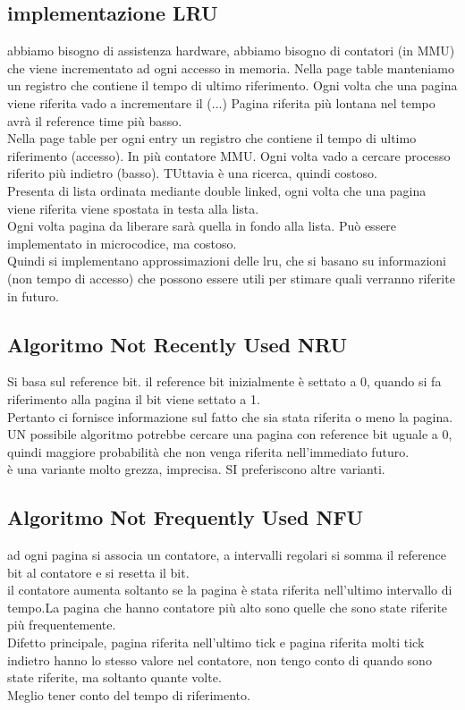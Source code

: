 \documentclass{article}
\begin{document}
\subsection{implementazione LRU}
abbiamo bisogno di assistenza hardware, abbiamo bisogno di contatori (in MMU) che viene incrementato ad ogni accesso in memoria. Nella page table 
manteniamo un registro che contiene il tempo di ultimo riferimento. Ogni volta che una pagina viene riferita vado a incrementare il (...) 
Pagina riferita più lontana nel tempo avrà il reference time più basso.\\
Nella page table per ogni entry un registro che contiene il tempo di ultimo riferimento (accesso). In più contatore MMU. Ogni volta 
vado a cercare processo riferito più indietro (basso). TUttavia è una ricerca, quindi costoso.\\
Presenta di lista ordinata mediante double linked, ogni volta che una pagina viene riferita viene spostata in testa alla lista.\\
Ogni volta pagina da liberare sarà quella in fondo alla lista. Può essere implementato in microcodice, ma costoso.\\
Quindi si implementano approssimazioni delle lru, che si basano su informazioni (non tempo di accesso) che 
possono essere utili per stimare quali verranno riferite in futuro.\\
\subsection{Algoritmo Not Recently Used NRU}
Si basa sul reference bit. il reference bit inizialmente è settato a 0, quando si fa riferimento alla pagina 
il bit viene settato a 1.\\
Pertanto ci fornisce informazione sul fatto che sia stata riferita o meno la pagina.\\
UN possibile algoritmo potrebbe cercare una pagina con reference bit uguale a 0, quindi maggiore probabilità 
che non venga riferita nell'immediato futuro.\\ 
è una variante molto grezza, imprecisa. SI preferiscono altre varianti.\\
\subsection{Algoritmo Not Frequently Used NFU}
ad ogni pagina si associa un contatore, a intervalli regolari si somma il reference bit al contatore e si resetta il bit.\\
il contatore aumenta soltanto se la pagina è stata riferita nell'ultimo intervallo di tempo.La pagina che hanno contatore più alto sono 
quelle che sono state riferite più frequentemente.\\
Difetto principale, pagina riferita nell'ultimo tick e pagina riferita molti tick indietro hanno lo stesso valore nel contatore, 
non tengo conto di quando sono state riferite, ma soltanto quante volte.\\
Meglio tener conto del tempo di riferimento.\\
\end{document}
